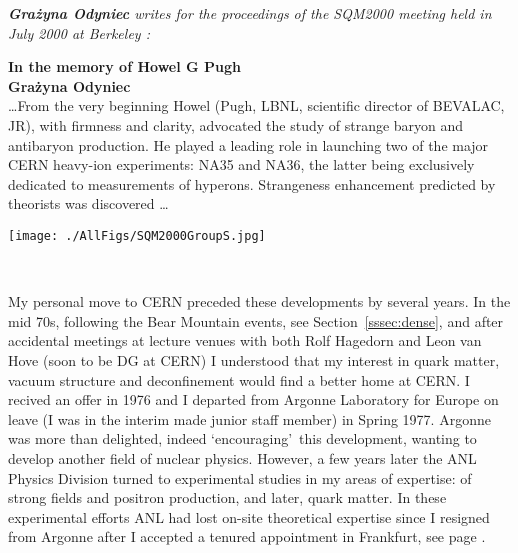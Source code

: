 \noindent \textit{\textbf{Gra\.zyna Odyniec} writes for the proceedings of the SQM2000 meeting held in July 2000 at Berkeley \cite{Odyniec:2001}:}\\[-0.7cm]
%
\begin{mdframed}[linecolor=gray,roundcorner=12pt,backgroundcolor=GreenYellow!15,linewidth=1pt,leftmargin=0cm,rightmargin=0cm,topline=true,bottomline=true,skipabove=12pt]\relax%
%
\label{Pugh}
{\Large\bf In the memory of Howel G Pugh}\\[0.1cm]
{\bf Gra\.zyna Odyniec}\\
%
\ldots From the very beginning Howel (Pugh, LBNL, scientific director of BEVALAC, JR), with firmness and clarity, advocated the study of strange baryon and antibaryon production. He played a leading role in launching two of the major CERN heavy-ion experiments: NA35 and NA36, the latter being exclusively dedicated to measurements of hyperons. Strangeness enhancement predicted by theorists was discovered \ldots\\[0.2cm]
%
\centerline{\texttt{[image: ./AllFigs/SQM2000GroupS.jpg]}}
{}\\


\end{mdframed}
\vskip 0.5cm

My personal move to CERN preceded these developments by several years. In the mid 70s, following the Bear Mountain events, see Section~\ref{sssec:dense}, and after accidental meetings at lecture venues with both Rolf Hagedorn and Leon van Hove (soon to be DG at CERN) I understood that my interest in quark matter, vacuum structure and deconfinement would find a better home at CERN. I recived an offer in 1976 and I departed from Argonne Laboratory for Europe on leave (I was in the interim made junior staff member) in Spring 1977. Argonne was more than delighted, indeed \lq encouraging\rq\ this development, wanting to develop another field of nuclear physics. However, a few years later the ANL Physics Division turned to experimental studies in my areas of expertise: of strong fields and positron production, and later, quark matter. In these experimental efforts ANL had lost on-site theoretical expertise since I resigned from Argonne after I accepted a tenured appointment in Frankfurt, see page \pageref{FRAINAU}.

